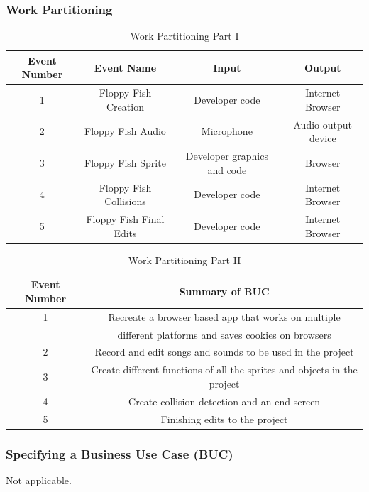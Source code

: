 \documentclass[11pt, oneside]{article}   	%
\begin{document}
\subsubsection{Work Partitioning}
\begin{table}[H]
\caption{Work Partitioning Part I}
\begin{center}
\begin{tabular}{|c|c|c|c|}
\hline
Event Number & Event Name & Input & Output\\
\hline
1 & Floppy Fish Creation & Developer code & Internet Browser\\
\hline
2 & Floppy Fish Audio & Microphone & Audio output device\\
\hline
3 & Floppy Fish Sprite & Developer graphics and code & Browser\\
\hline
4 & Floppy Fish Collisions & Developer code & Internet Browser\\
\hline
5 & Floppy Fish Final Edits & Developer code & Internet Browser\\
\hline
\end{tabular}
\end{center}
\label{default}
\end{table}%

\begin{table}[H]
\caption{Work Partitioning Part II}
\begin{center}
\begin{tabular}{|c|c|}

\hline
Event Number & Summary of BUC\\
\hline
1 & Recreate a browser based app that works on multiple\\ &different platforms and saves cookies on browsers\\
\hline
2 & Record and edit songs and sounds to be used in the project\\
\hline
3 & Create different functions of all the sprites and objects in the project\\
\hline
4 & Create collision detection and an end screen\\
\hline
5 & Finishing edits to the project\\
\hline

\end{tabular}
\end{center}
\label{default}
\end{table}%



\subsubsection{Specifying a Business Use Case (BUC)}
Not applicable.
\end{document}
